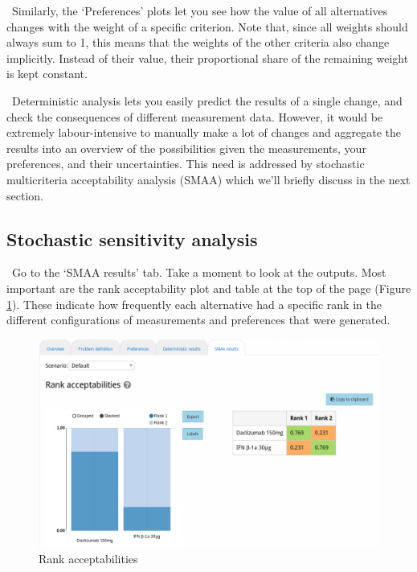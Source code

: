 \documentclass[00_mcda_tutorial.tex]{subfiles}
\begin{document}
\noindent \faGraduationCap \, Similarly, the ‘Preferences’ plots let you see how the value of all alternatives changes with the weight of a specific criterion. Note that, since all weights should always sum to 1, this means that the weights of the other criteria also change implicitly. Instead of their value, their proportional share of the remaining weight is kept constant.
\newline

\noindent \faGraduationCap \, Deterministic analysis lets you easily predict the results of a single change, and check the consequences of different measurement data. However, it would be extremely labour-intensive to manually make a lot of changes and aggregate the results into an overview of the possibilities given the measurements, your preferences, and their uncertainties. This need is addressed by stochastic multicriteria acceptability analysis (SMAA) which we’ll briefly discuss in the next section.

\subsection*{Stochastic sensitivity analysis}
\noindent \leftpointright \, Go to the ‘SMAA results’ tab. Take a moment to look at the outputs. Most important are the rank acceptability plot and table at the top of the page (Figure \ref{fig:rankAcceptabilities}). These indicate how frequently each alternative had a specific rank in the different configurations of measurements and preferences that were generated.
\newline

\begin{figure}[!h]
    \centering
	\includegraphics[width=\textwidth]{fig/rankAcceptabilities.png}
    \caption{Rank acceptabilities}
	\label{fig:rankAcceptabilities}
\end{figure}
\end{document}
